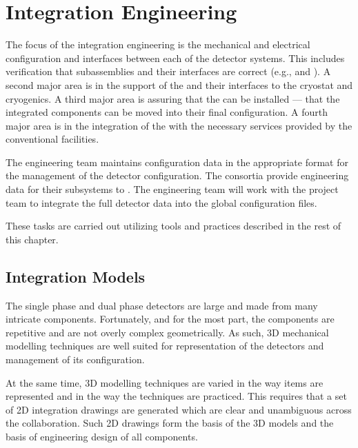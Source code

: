 \chapter{Integration Engineering}
\label{sec:fdsp-coord-integ-sysengr}

The focus of the integration engineering is the mechanical and
electrical configuration and interfaces between each of the detector
systems. This includes verification that subassemblies and their
interfaces are correct (e.g.,  and \single {}). A
second major area is in the support of the  and
their interfaces to the cryostat and cryogenics. A third major area is
assuring that the  can be installed --- that the
integrated components can be moved into their final configuration. A
fourth major area is in the integration of the  with
the necessary services provided by the conventional facilities.


The  engineering team maintains configuration data in
the appropriate format for the management of the detector
configuration. The consortia provide engineering data for their
subsystems to . The  engineering team will work
with the  project team to integrate the full detector data
into the global  configuration files.

These tasks are carried out utilizing tools and practices
described in the rest of this chapter.

\section{Integration Models}
\label{sec:fdsp-coord-integ-models}
The single phase and dual phase detectors are large and made from many
intricate components. Fortunately, and for the most part, the
components are repetitive and are not overly complex geometrically. As
such, 3D mechanical modelling techniques are well suited for
representation of the detectors and management of its configuration.


At the same time, 3D modelling techniques are varied in the way items
are represented and in the way the techniques are practiced. This
requires that a set of 2D integration drawings are generated which are
clear and unambiguous across the collaboration. Such 2D drawings form
the basis of the 3D models and the basis of engineering design of all
components.

